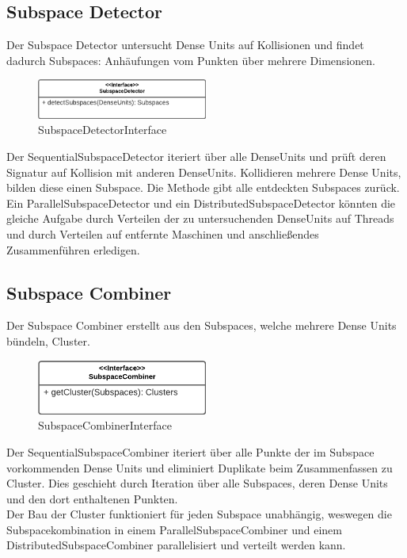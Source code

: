 \subsection{Subspace Detector}
Der Subspace Detector untersucht Dense Units auf Kollisionen und findet dadurch Subspaces: Anhäufungen vom Punkten über mehrere Dimensionen.
\begin{figure}[h]
	\centering
	\includegraphics[width=0.5\textwidth]{./Bilder/Restrukturierung/SubspaceDetector.png}
	\caption{SubspaceDetectorInterface}
\end{figure}
Der SequentialSubspaceDetector iteriert über alle DenseUnits und prüft deren Signatur auf Kollision mit anderen DenseUnits. Kollidieren mehrere Dense Units, bilden diese einen Subspace. Die Methode gibt alle entdeckten Subspaces zurück.\\
Ein ParallelSubspaceDetector und ein DistributedSubspaceDetector könnten die gleiche Aufgabe durch Verteilen der zu untersuchenden DenseUnits auf Threads und durch Verteilen auf entfernte Maschinen und anschließendes Zusammenführen erledigen.

\subsection{Subspace Combiner}
Der Subspace Combiner erstellt aus den Subspaces, welche mehrere Dense Units bündeln, Cluster.
\begin{figure}[h]
	\centering
	\includegraphics[width=0.5\textwidth]{./Bilder/Restrukturierung/SubspaceCombiner.png}
	\caption{SubspaceCombinerInterface}
\end{figure}
Der SequentialSubspaceCombiner iteriert über alle Punkte der im Subspace vorkommenden Dense Units und eliminiert Duplikate beim Zusammenfassen zu Cluster. Dies geschieht durch Iteration über alle Subspaces, deren Dense Units und den dort enthaltenen Punkten.\\
Der Bau der Cluster funktioniert für jeden Subspace unabhängig, weswegen die Subspacekombination in einem ParallelSubspaceCombiner und einem DistributedSubspaceCombiner parallelisiert und verteilt werden kann.

